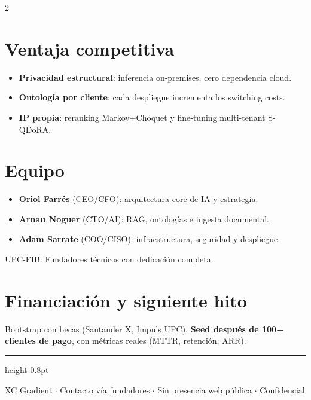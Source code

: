 \documentclass[10pt,a4paper]{article}
\begin{document}
\begin{multicols}{2}
\section{Ventaja competitiva}
\begin{itemize}[leftmargin=1em,itemsep=1pt,topsep=2pt]
\item \textbf{Privacidad estructural}: inferencia on-premises, cero dependencia cloud.
\item \textbf{Ontolog\'ia por cliente}: cada despliegue incrementa los switching costs.
\item \textbf{IP propia}: reranking Markov+Choquet y fine-tuning multi-tenant S-QDoRA.
\end{itemize}

\section{Equipo}
\begin{itemize}[leftmargin=1em,itemsep=1pt,topsep=2pt]
\item \textbf{Oriol Farr\'es} (CEO/CFO): arquitectura core de IA y estrategia.
\item \textbf{Arnau Noguer} (CTO/AI): RAG, ontolog\'ias e ingesta documental.
\item \textbf{Adam Sarrate} (COO/CISO): infraestructura, seguridad y despliegue.
\end{itemize}
UPC-FIB. Fundadores t\'ecnicos con dedicaci\'on completa.

\section{Financiaci\'on y siguiente hito}
Bootstrap con becas (Santander X, Impuls UPC). \textbf{Seed despu\'es de 100+ clientes de pago}, con m\'etricas reales (MTTR, retenci\'on, ARR).

\end{multicols}

\vspace{0.2em}
{\color{accent}\hrule height 0.8pt}
\vspace{0.15em}
\begin{center}
\small\textcolor{midgray}{XC Gradient $\cdot$ Contacto v\'ia fundadores $\cdot$ Sin presencia web p\'ublica $\cdot$ Confidencial}
\end{center}
\end{document}
